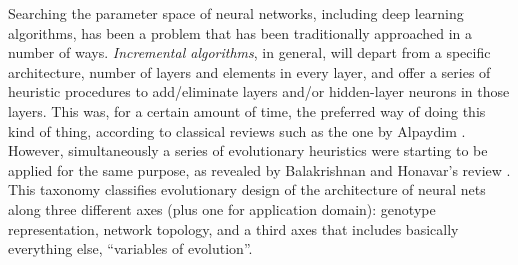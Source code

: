 \documentclass[runningheads]{llncs}
\begin{document}
Searching the parameter space of neural networks, including deep
learning algorithms, has been a problem that has been traditionally
approached in a number of ways. {\em Incremental algorithms}, in
general, will depart from a specific architecture, number of layers
and elements in every layer, and offer a series of heuristic
procedures to add/eliminate layers and/or hidden-layer neurons in
those layers. This was, for a certain amount of time, the preferred
way of doing this kind of thing, according to classical reviews such
as the one by Alpaydim \cite{Alpaydim}. However, simultaneously a
series of evolutionary heuristics were starting to be applied for the
same purpose, as revealed by Balakrishnan and Honavar's review
\cite{balakrishnan95:EDNA}. This taxonomy classifies evolutionary
design of the architecture of neural nets along three different axes
(plus one for application domain): genotype representation, network
topology, and a third axes that includes basically everything else,
``variables of evolution''.
\end{document}
